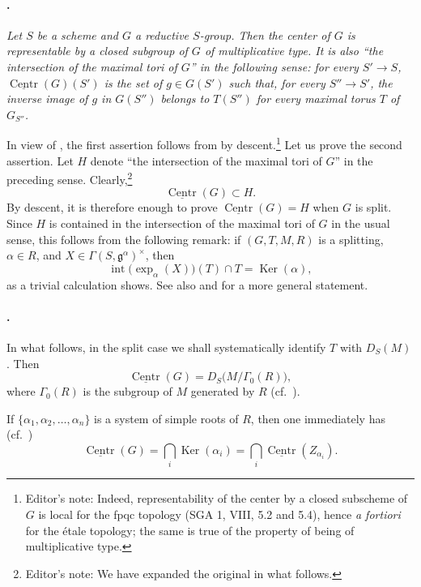 \paragraph{.}
\textit{Let \(S\) be a scheme and \(G\) a reductive \(S\)-group.
Then the center of \(G\) is representable by a closed subgroup of
\(G\) of multiplicative type. It is also ``the intersection of the
maximal tori of \(G\)'' in the following sense: for every
\(S'\to S\), \(\underline{\operatorname{Centr}}(G)(S')\) is the set
of \(g\in G(S')\) such that, for every \(S''\to S'\), the inverse
image of \(g\) in \(G(S'')\) belongs to \(T(S'')\) for every maximal
torus \(T\) of \(G_{S''}\).}

In view of , the first assertion follows from  by
descent.\footnote{Editor's note: Indeed, representability of the
center by a closed subscheme of \(G\) is local for the fpqc topology
\textup{(SGA 1, VIII, 5.2 and 5.4)}, hence \emph{a fortiori} for the
étale topology; the same is true of the property of being of
multiplicative type.}
Let us prove the second assertion. Let \(H\) denote ``the
intersection of the maximal tori of \(G\)'' in the preceding sense.
Clearly,\footnote{Editor's note: We have expanded the original in
what follows.}
\[
  \underline{\operatorname{Centr}}(G)\subset H.
\]
By descent, it is therefore enough to prove
\(\underline{\operatorname{Centr}}(G)=H\) when \(G\) is split.
Since \(H\) is contained in the intersection of the maximal tori of
\(G\) in the usual sense, this follows from the following remark:
if \((G,T,M,R)\) is a splitting, \(\alpha\in R\), and
\(X\in\Gamma(S,\mathfrak g^\alpha)^\times\), then
\[
  \operatorname{int}\bigl(\exp_\alpha(X)\bigr)(T)\cap T
  =
  \operatorname{Ker}(\alpha),
\]
as a trivial calculation shows. See also  and 
for a more general statement.

\paragraph{.}
In what follows, in the split case we shall systematically identify
\(T\) with \(D_S(M)\). Then
\[
  \underline{\operatorname{Centr}}(G)
  =
  D_S\bigl(M/\Gamma_0(R)\bigr),
\]
where \(\Gamma_0(R)\) is the subgroup of \(M\) generated by \(R\)
\textup{(cf.\ )}.
\par\noindent
If
\(\{\alpha_1,\alpha_2,\ldots,\alpha_n\}\) is a system of simple
roots of \(R\), then one immediately has
\textup{(cf.\ )}
\[
  \underline{\operatorname{Centr}}(G)
  =
  \bigcap_i\operatorname{Ker}(\alpha_i)
  =
  \bigcap_i\underline{\operatorname{Centr}}(Z_{\alpha_i}).
\]

